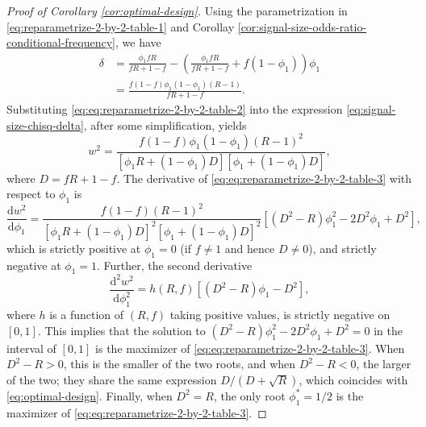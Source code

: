\begin{proof}[Proof of Corollary \ref{cor:optimal-design}]
Using the parametrization in \eqref{eq:reparametrize-2-by-2-table-1} and Corollay \ref{cor:signal-size-odds-ratio-conditional-frequency}, we have
\begin{align}
    \delta &= \frac{\phi_1 fR}{fR+1-f} - \left(\frac{\phi_1 fR}{fR+1-f} + f(1-\phi_1)\right)\phi_1 \nonumber \\
    &= \frac{f(1-f)\phi_1(1-\phi_1)(R-1)}{fR+1-f}. \label{eq:eq:reparametrize-2-by-2-table-2}
\end{align}
Substituting \eqref{eq:eq:reparametrize-2-by-2-table-2} into the expression \eqref{eq:signal-size-chisq-delta}, after some simplification, yields
\begin{equation} \label{eq:eq:reparametrize-2-by-2-table-3}
    w^2 = \frac{f(1-f)\phi_1(1-\phi_1)(R-1)^2}{\left[\phi_1 R + (1-\phi_1)D\right]\left[\phi_1 + (1-\phi_1)D\right]},
\end{equation}
where $D = fR+1-f$.
The derivative of \eqref{eq:eq:reparametrize-2-by-2-table-3} with respect to $\phi_1$ is
\begin{equation*}
    \frac{\mathrm{d}w^2}{\mathrm{d}\phi_1} = 
    \frac{f(1-f)(R-1)^2}{\left[\phi_1 R+(1-\phi_1)D\right]^2 \left[\phi_1+(1-\phi_1)D\right]^2} \left[(D^2-R)\phi_1^2 - 2D^2\phi_1 + D^2\right],
\end{equation*}
which is strictly positive at $\phi_1=0$ (if $f\neq1$ and hence $D\neq0$), and strictly negative at $\phi_1=1$.
Further, the second derivative
\begin{equation*}
    \frac{\mathrm{d}^2w^2}{\mathrm{d}\phi_1^2} = 
    h(R,f) \left[(D^2-R)\phi_1 - D^2\right],
\end{equation*}
where $h$ is a function of $(R,f)$ taking positive values, is strictly negative on $[0,1]$.
This implies that the solution to $(D^2-R)\phi_1^2 - 2D^2\phi_1 + D^2 = 0$ in the interval of $[0,1]$ is the maximizer of \eqref{eq:eq:reparametrize-2-by-2-table-3}.
When $D^2-R>0$, this is the smaller of the two roots, and when $D^2-R<0$, the larger of the two;
they share the same expression ${D}/{(D+\sqrt{R})}$, which coincides with \eqref{eq:optimal-design}.
Finally, when $D^2=R$, the only root $\phi_1^*=1/2$ is the maximizer of \eqref{eq:eq:reparametrize-2-by-2-table-3}.
\end{proof}
